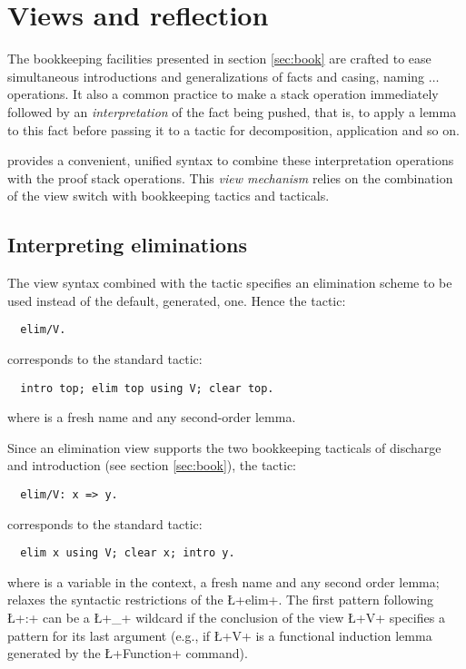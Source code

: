 \section{Views and reflection}\label{sec:views}

The bookkeeping facilities presented in section \ref{sec:book} are
crafted to ease simultaneous introductions and generalizations of facts and
casing,
naming $\dots$ operations. It also a common practice to make a stack
operation immediately followed by an \emph{interpretation} of the fact
being pushed,
that is, to apply a lemma to this fact before passing it
to a tactic for decomposition, application and so on.




\ssr{} provides a convenient, unified syntax to combine these
interpretation operations with the proof stack operations. This
\emph{view mechanism} relies on the combination of the \C{/} view
switch with bookkeeping tactics and tacticals.

\subsection{Interpreting eliminations}

The view syntax combined with the  tactic specifies an
elimination scheme to
be used instead of the default, generated, one. Hence the \ssr{} tactic:
\begin{lstlisting}
  elim/V.
\end{lstlisting}
corresponds to the standard \Coq{} tactic:
\begin{lstlisting}
  intro top; elim top using V; clear top.
\end{lstlisting}
where  is a fresh name and  any second-order lemma.

Since an elimination view supports the two bookkeeping tacticals of
discharge and introduction (see section \ref{sec:book}), the \ssr{} tactic:
\begin{lstlisting}
  elim/V: x => y.
\end{lstlisting}
corresponds to the standard \Coq{} tactic:
\begin{lstlisting}
  elim x using V; clear x; intro y.
\end{lstlisting}
where  is a variable in the context,  a fresh name and 
any second order lemma; \ssr{} relaxes the syntactic restrictions of
the \Coq{} \L+elim+. The first pattern following \L+:+ can be a \L+_+
wildcard if the conclusion of the view \L+V+ specifies a pattern for
its last argument (e.g., if \L+V+ is a functional induction lemma
generated by the \L+Function+ command).

